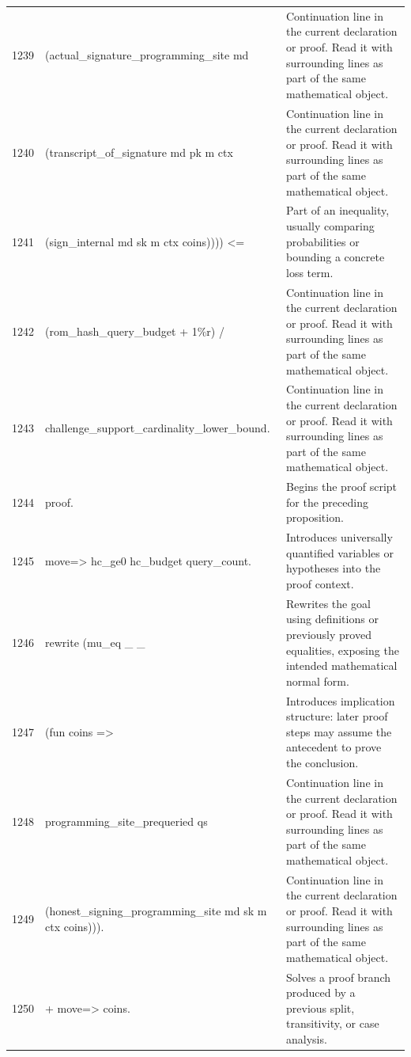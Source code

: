 \documentclass[10pt]{article}
\begin{document}
\begin{longtable}{r L{0.53\textwidth} L{0.37\textwidth}}
1239 & {\ttfamily\scriptsize         (actual\_signature\_programming\_site md} & Continuation line in the current declaration or proof.  Read it with surrounding lines as part of the same mathematical object. \\
1240 & {\ttfamily\scriptsize           (transcript\_of\_signature md pk m ctx} & Continuation line in the current declaration or proof.  Read it with surrounding lines as part of the same mathematical object. \\
1241 & {\ttfamily\scriptsize             (sign\_internal md sk m ctx coins)))) <=} & Part of an inequality, usually comparing probabilities or bounding a concrete loss term. \\
1242 & {\ttfamily\scriptsize   (rom\_hash\_query\_budget + 1\%r) /} & Continuation line in the current declaration or proof.  Read it with surrounding lines as part of the same mathematical object. \\
1243 & {\ttfamily\scriptsize     challenge\_support\_cardinality\_lower\_bound.} & Continuation line in the current declaration or proof.  Read it with surrounding lines as part of the same mathematical object. \\
1244 & {\ttfamily\scriptsize proof.} & Begins the proof script for the preceding proposition. \\
1245 & {\ttfamily\scriptsize move=> hc\_ge0 hc\_budget query\_count.} & Introduces universally quantified variables or hypotheses into the proof context. \\
1246 & {\ttfamily\scriptsize rewrite (mu\_eq \_ \_} & Rewrites the goal using definitions or previously proved equalities, exposing the intended mathematical normal form. \\
1247 & {\ttfamily\scriptsize   (fun coins =>} & Introduces implication structure: later proof steps may assume the antecedent to prove the conclusion. \\
1248 & {\ttfamily\scriptsize     programming\_site\_prequeried qs} & Continuation line in the current declaration or proof.  Read it with surrounding lines as part of the same mathematical object. \\
1249 & {\ttfamily\scriptsize       (honest\_signing\_programming\_site md sk m ctx coins))).} & Continuation line in the current declaration or proof.  Read it with surrounding lines as part of the same mathematical object. \\
1250 & {\ttfamily\scriptsize + move=> coins.} & Solves a proof branch produced by a previous split, transitivity, or case analysis. \\

\end{longtable}
\end{document}
